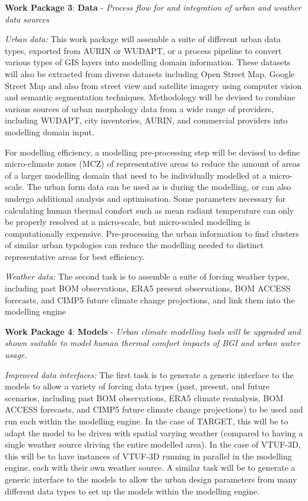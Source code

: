 \textbf{Work Package 3}: \textbf{Data} - \emph{Process flow for and integration of urban and weather data sources  }

\emph{Urban data:} This work package will assemble a suite of different urban data types, exported from AURIN or WUDAPT, or a process pipeline to convert various types of GIS layers into modelling domain information. These datasets will also be extracted from diverse datasets including Open Street Map, Google Street Map and also from street view and satellite imagery using computer vision and semantic segmentation techniques. Methodology will be devised to combine various sources of urban morphology data from a wide range of providers, including WUDAPT, city inventories, AURIN, and commercial providers into modelling domain input.

For modelling efficiency, a modelling pre-processing step will be devised to define micro-climate zones (MCZ) of representative areas to reduce the amount of areas of a larger modelling domain that need to be individually modelled at a micro-scale. The urban form data can be used as is during the modelling, or can also undergo additional analysis and optimisation. Some parameters necessary for calculating human thermal comfort such as mean radiant temperature can only be properly resolved at a micro-scale, but micro-scaled modelling is computationally expensive. Pre-processing the urban information to find clusters of similar urban typologies can reduce the modelling needed to distinct representative areas for best efficiency.

\emph{Weather data:} The second task is to assemble a suite of forcing weather types, including past BOM observations, ERA5 present observations, BOM ACCESS forecasts, and CIMP5 future climate change projections, and link them into the modelling engine

\textbf{Work Package 4}: \textbf{Models} - \emph{Urban climate modelling tools will be upgraded and shown suitable to model human thermal comfort impacts of BGI and urban water usage.  }

\emph{Improved data interfaces:} The first task is to generate a generic interface to the models to allow a variety of forcing data types (past, present, and future scenarios, including past BOM observations, ERA5 climate reanalysis, BOM ACCESS forecasts, and CIMP5 future climate change projections) to be used and run each within the modelling engine. In the case of TARGET, this will be to adapt the model to be driven with spatial varying weather (compared to having a single weather source driving the entire modelled area). In the case of VTUF-3D, this will be to have instances of VTUF-3D running in parallel in the modelling engine, each with their own weather source. A similar task will be to generate a generic interface to the models to allow the urban design parameters from many different data types to set up the models within the modelling engine.

